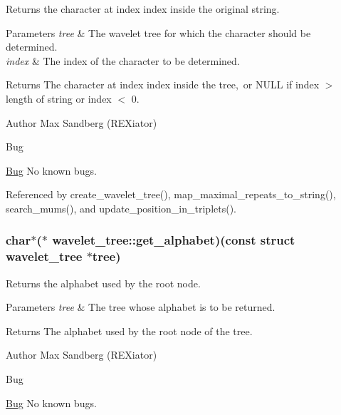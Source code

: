 \-Returns the character at index {\ttfamily index} inside the original string. 


\begin{DoxyParams}{\-Parameters}
{\em tree} & \-The wavelet tree for which the character should be determined. \\
\hline
{\em index} & \-The index of the character to be determined. \\
\hline
\end{DoxyParams}
\begin{DoxyReturn}{\-Returns}
\-The character at index {\ttfamily index} inside the tree, or {\ttfamily \-N\-U\-L\-L} if index $>$ length of string or index $<$ 0. 
\end{DoxyReturn}
\begin{DoxyAuthor}{\-Author}
\-Max \-Sandberg (\-R\-E\-Xiator) 
\end{DoxyAuthor}
\begin{DoxyRefDesc}{\-Bug}
\item[\hyperlink{bug__bug000162}{\-Bug}]\-No known bugs. \end{DoxyRefDesc}


\-Referenced by create\-\_\-wavelet\-\_\-tree(), map\-\_\-maximal\-\_\-repeats\-\_\-to\-\_\-string(), search\-\_\-mums(), and update\-\_\-position\-\_\-in\-\_\-triplets().

\hypertarget{structwavelet__tree_a739eef1c9eb98267d0fdc75ba05d99b7}{
\subsubsection[{get\-\_\-alphabet}]{\setlength{\rightskip}{0pt plus 5cm}char$\ast$($\ast$ {\bf wavelet\-\_\-tree\-::get\-\_\-alphabet})(const struct {\bf wavelet\-\_\-tree} $\ast$tree)}}\label{structwavelet__tree_a739eef1c9eb98267d0fdc75ba05d99b7}


\-Returns the alphabet used by the root node. 


\begin{DoxyParams}{\-Parameters}
{\em tree} & \-The tree whose alphabet is to be returned. \\
\hline
\end{DoxyParams}
\begin{DoxyReturn}{\-Returns}
\-The alphabet used by the root node of the tree. 
\end{DoxyReturn}
\begin{DoxyAuthor}{\-Author}
\-Max \-Sandberg (\-R\-E\-Xiator) 
\end{DoxyAuthor}
\begin{DoxyRefDesc}{\-Bug}
\item[\hyperlink{bug__bug000160}{\-Bug}]\-No known bugs. \end{DoxyRefDesc}


